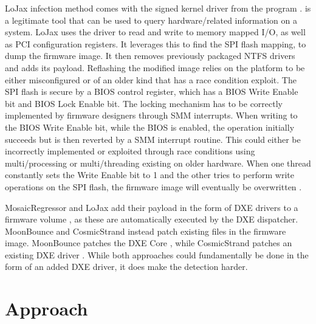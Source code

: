 LoJax infection method comes with the signed kernel driver from the program .
 is a legitimate tool that can be used to query hardware\-/related information on a system.
LoJax uses the driver to read and write to memory mapped \ac{I/O}, as well as \ac{PCI} configuration registers.
It leverages this to find the \ac{SPI} flash mapping, to dump the firmware image.
It then removes previously packaged \ac{NTFS} drivers and adds its payload.
Reflashing the modified image relies on the platform to be either misconfigured or of an older kind that has a race condition exploit.
The \ac{SPI} flash is secure by a \ac{BIOS} control register, which has a \ac{BIOS} Write Enable bit and \ac{BIOS} Lock Enable bit.
The locking mechanism has to be correctly implemented by firmware designers through \ac{SMM} interrupts.
When writing to the \ac{BIOS} Write Enable bit, while the \ac{BIOS} is enabled, the operation initially succeeds but is then reverted by a \ac{SMM} interrupt routine.
This could either be incorrectly implemented or exploited through race conditions using multi\-/processing or multi\-/threading existing on older hardware.
When one thread constantly sets the Write Enable bit to 1 and the other tries to perform write operations on the \ac{SPI} flash, the firmware image will eventually be overwritten \cite{lojax}.

MosaicRegressor and LoJax add their payload in the form of \ac{DXE} drivers to a firmware volume \cite{mosaicregressor-technical-details,lojax}, as these are automatically executed by the \ac{DXE} dispatcher.
MoonBounce and CosmicStrand instead patch existing files in the firmware image.
MoonBounce patches the \ac{DXE} Core \cite{moonbounce}, while CosmicStrand patches an existing \ac{DXE} driver \cite{cosmicstrand}.
While both approaches could fundamentally be done in the form of an added \ac{DXE} driver, it does make the detection harder.

\section{Approach}


